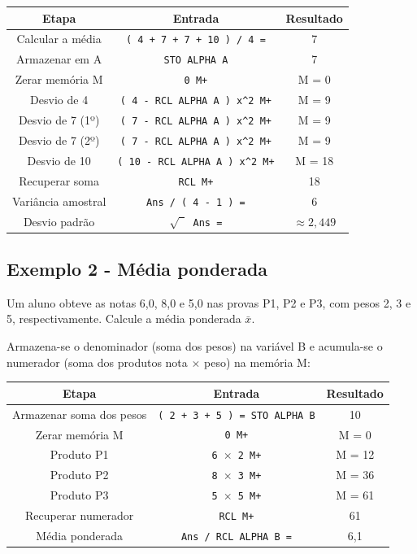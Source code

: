 \begin{table}[H]
    \centering
    \begin{tabular}{|c|c|c|}
        \hline
        \textbf{Etapa} & \textbf{Entrada} & \textbf{Resultado} \\ \hline
            Calcular a média & \texttt{( 4 + 7 + 7 + 10 ) / 4 =} & 7 \\
            Armazenar em A & \texttt{STO ALPHA A} & 7 \\
            Zerar memória M & \texttt{0 M+} & M = 0 \\
            Desvio de 4 & \texttt{( 4 - RCL ALPHA A ) x\textasciicircum{}2 M+} & M = 9 \\
            Desvio de 7 (1º) & \texttt{( 7 - RCL ALPHA A ) x\textasciicircum{}2 M+} & M = 9 \\
            Desvio de 7 (2º) & \texttt{( 7 - RCL ALPHA A ) x\textasciicircum{}2 M+} & M = 9 \\
            Desvio de 10 & \texttt{( 10 - RCL ALPHA A ) x\textasciicircum{}2 M+} & M = 18 \\
            Recuperar soma & \texttt{RCL M+} & 18 \\
            Variância amostral & \texttt{Ans / ( 4 - 1 ) =} & 6 \\
            Desvio padrão & \texttt{$\sqrt{\phantom{0}}$ Ans =} & $\approx 2{,}449$ \\ \hline
    \end{tabular}
\end{table}

\subsection*{Exemplo 2 - Média ponderada} 

Um aluno obteve as notas 6,0, 8,0 e 5,0 nas provas P1, P2 e P3, com pesos 2, 3 e 5, respectivamente. Calcule a média ponderada $\bar{x}$.

Armazena-se o denominador (soma dos pesos) na variável B e acumula-se o numerador (soma dos produtos nota $\times$ peso) na memória M:

\begin{table}[H]
    \centering
    \begin{tabular}{|c|c|c|}
        \hline
        \textbf{Etapa} & \textbf{Entrada} & \textbf{Resultado} \\ \hline
            Armazenar soma dos pesos & \texttt{( 2 + 3 + 5 ) = STO ALPHA B} & 10 \\
            Zerar memória M & \texttt{0 M+} & M = 0 \\
            Produto P1 & \texttt{6 $\times$ 2 M+} & M = 12 \\
            Produto P2 & \texttt{8 $\times$ 3 M+} & M = 36 \\
            Produto P3 & \texttt{5 $\times$ 5 M+} & M = 61 \\
            Recuperar numerador & \texttt{RCL M+} & 61 \\
            Média ponderada & \texttt{Ans / RCL ALPHA B =} & 6{,}1 \\ \hline
    \end{tabular}
\end{table}